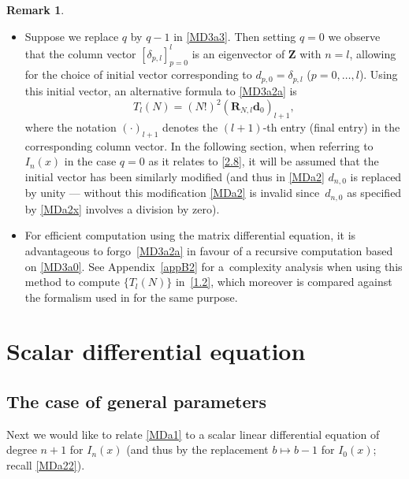 \documentclass[pdftex]{sigma}
\numberwithin{equation}{section}
\theoremstyle{definition}
\newtheorem{Remark}[Theorem]{Remark}
\begin{document}
\begin{Remark}\label{R3.1} \:
\begin{itemize}\itemsep=0pt
\item[(1)] Suppose we replace $q$ by $q-1$ in \eqref{MD3a3}. Then setting $q=0$ we observe that
the column vector $[\delta_{p,l}]_{p=0}^{l}$
 is an eigenvector of ${\mathbf Z}$
 with $n=l$,
 allowing for the choice of initial vector corresponding to $d_{p,0} = \delta_{p,l}$ ($p=0,\dots,l$). Using this initial vector, an alternative formula to \eqref{MD3a2a} is
\[%
T_l(N) = (N!)^2
( \mathbf R_{N,l} \mathbf d_0)_{l+1},\]
where the notation $( \cdot )_{l+1}$ denotes the $(l+1)$-th entry (final entry) in the corresponding column vector. In the following section, when referring to $I_n(x)$ in the case $q=0$ as it relates to \eqref{2.8}, it will be assumed that the initial vector has been similarly modified (and thus in
\eqref{MDa2} $d_{n,0}$ is replaced by unity --- without this modification
\eqref{MDa2} is invalid since~$d_{n,0}$ {as specified by \eqref{MDa2x}}
involves a division by zero).

\item[(2)] For efficient computation using the matrix differential equation, it is advantageous to forgo~\eqref{MD3a2a} in favour of a recursive computation based on \eqref{MD3a0}. See
Appendix~\ref{appB2} for a~complexity analysis when using this method to
compute $\{T_l(N)\}$ in~\eqref{1.2}, which moreover is compared against the formalism used in
\cite{Bo24,FM23} for the same purpose.
\end{itemize}
\end{Remark}



\section{Scalar differential equation}
\subsection{The case of general parameters}
Next we would like to relate \eqref{MDa1} to a scalar linear differential equation of degree $n+1$ for $I_n(x)$ (and thus by the replacement $b \mapsto b-1$
for $I_0(x)$; recall \eqref{MDa22}).
\end{document}
